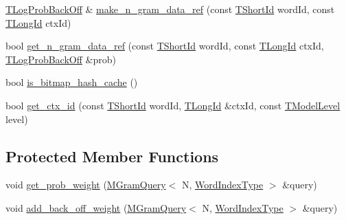 \begin{DoxyCompactItemize}
\hyperlink{namespaceuva_1_1smt_1_1tries_acd0660255dd9ef5d644f01de49102750}{T\+Log\+Prob\+Back\+Off} \& \hyperlink{classuva_1_1smt_1_1tries_1_1_layered_trie_base_a95087d99d7a5e2fa2b618d4eb2411b4f}{make\+\_\+n\+\_\+gram\+\_\+data\+\_\+ref} (const \hyperlink{namespaceuva_1_1smt_1_1hashing_adcf22e1982ad09d3a63494c006267469}{T\+Short\+Id} word\+Id, const \hyperlink{namespaceuva_1_1smt_1_1hashing_a5992ac0dea0fb3226fb403ede09fad55}{T\+Long\+Id} ctx\+Id)
\item 
bool \hyperlink{classuva_1_1smt_1_1tries_1_1_layered_trie_base_a7abdc310c082d7c4507754e8c0c18635}{get\+\_\+n\+\_\+gram\+\_\+data\+\_\+ref} (const \hyperlink{namespaceuva_1_1smt_1_1hashing_adcf22e1982ad09d3a63494c006267469}{T\+Short\+Id} word\+Id, const \hyperlink{namespaceuva_1_1smt_1_1hashing_a5992ac0dea0fb3226fb403ede09fad55}{T\+Long\+Id} ctx\+Id, \hyperlink{namespaceuva_1_1smt_1_1tries_acd0660255dd9ef5d644f01de49102750}{T\+Log\+Prob\+Back\+Off} \&prob)
\item 
bool \hyperlink{classuva_1_1smt_1_1tries_1_1_layered_trie_base_af28d0ff5325216ce899a6daeecf9eb0e}{is\+\_\+bitmap\+\_\+hash\+\_\+cache} ()
\item 
bool \hyperlink{classuva_1_1smt_1_1tries_1_1_layered_trie_base_ae313158c1fda05029b36de0555b76250}{get\+\_\+ctx\+\_\+id} (const \hyperlink{namespaceuva_1_1smt_1_1hashing_adcf22e1982ad09d3a63494c006267469}{T\+Short\+Id} word\+Id, \hyperlink{namespaceuva_1_1smt_1_1hashing_a5992ac0dea0fb3226fb403ede09fad55}{T\+Long\+Id} \&ctx\+Id, const \hyperlink{namespaceuva_1_1smt_1_1tries_a20577a44b3a42d26524250634379b7cb}{T\+Model\+Level} level)
\end{DoxyCompactItemize}
\subsection*{Protected Member Functions}
\begin{DoxyCompactItemize}
\item 
void \hyperlink{classuva_1_1smt_1_1tries_1_1_layered_trie_base_a12ad691094ced09f16fbf1f7ea16a9e4}{get\+\_\+prob\+\_\+weight} (\hyperlink{structuva_1_1smt_1_1tries_1_1_m_gram_query}{M\+Gram\+Query}$<$ N, \hyperlink{classuva_1_1smt_1_1tries_1_1_word_index_trie_base_a30c4fffe3a3423c87b229b66340dd2f8}{Word\+Index\+Type} $>$ \&query)
\item 
void \hyperlink{classuva_1_1smt_1_1tries_1_1_layered_trie_base_a905e001e8079747dfd4e7def0971e8c1}{add\+\_\+back\+\_\+off\+\_\+weight} (\hyperlink{structuva_1_1smt_1_1tries_1_1_m_gram_query}{M\+Gram\+Query}$<$ N, \hyperlink{classuva_1_1smt_1_1tries_1_1_word_index_trie_base_a30c4fffe3a3423c87b229b66340dd2f8}{Word\+Index\+Type} $>$ \&query)
\end{DoxyCompactItemize}
